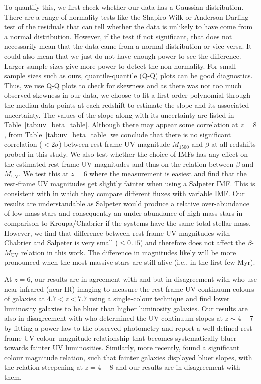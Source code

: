 \documentclass[twocolumn]{aastex63}
\begin{document}
To quantify this, we first check whether our data has a Gaussian distribution. There are a range of normality tests like the  Shapiro-Wilk or Anderson-Darling test of the residuals that can tell whether the data is unlikely to have come from a normal distribution. However, if the test if not significant, that does not necessarily mean that the data came from a normal distribution or vice-versa. It could also mean that we just do not have enough power to see the difference. Larger sample sizes give more power to detect the non-normality. For small sample sizes such as ours, quantile-quantile (Q-Q) plots can be good diagnostics. Thus, we use Q-Q plots to check for skewness and as there was not too much observed skewness in our data, we choose to fit a first-order polynomial through the median data points at each redshift to estimate the slope and its associated uncertainty. The values of the slope along with its uncertainty are listed in Table~\ref{tab:uv_beta_table}. Although there may appear some correlation at $z=8$, from Table~\ref{tab:uv_beta_table} we conclude that there is no significant correlation ($<2\sigma$) between rest-frame UV magnitude $M_{1500}$ and $\beta$ at all redshifts probed in this study. We also test whether the choice of IMFs has any effect on the estimated rest-frame UV magnitudes and thus on the relation between $\beta$ and $M_{\mathrm{UV}}$. We test this at $z=6$ where the measurement is easiest and find that the rest-frame UV magnitudes get slightly fainter when using a Salpeter IMF. This is consistent with \citet{Jerabkova2017} in which they compare different fluxes with variable IMF. Our results are understandable as Salpeter would produce a relative over-abundance of low-mass stars and consequently an under-abundance of high-mass stars in comparison to Kroupa/Chabrier if the systems have the same total stellar mass. However, we find that difference between rest-frame UV magnitudes with Chabrier and Salpeter is very small ($\leq0.15$) and therefore does not affect the $\beta$-$M_{\mathrm{UV}}$ relation in this work. The difference in magnitudes likely will be more pronounced when the most massive stars are still alive (i.e., in the first few Myr).

At $z=6$, our results are in agreement with \citet{Dunlop2012} and \citet{Finkelstein2012} but in disagreement with \citet{Wilkins2011} who use near-infrared (near-IR) imaging to measure the rest-frame UV continuum colours of galaxies at $4.7<z<7.7$ using a single-colour technique and find lower luminosity galaxies to be bluer than higher luminosity galaxies. Our results are also in disagreement with \citet{Bouwens2012} who determined the UV continuum slopes at $z\sim4-7$ by fitting a power law to the observed photometry and report a well-defined rest-frame UV colour--magnitude relationship that becomes systematically bluer towards fainter UV luminosities. Similarly, more recently, \citet{Bouwens2014b} found a significant colour magnitude relation, such that fainter galaxies displayed bluer slopes, with the relation steepening at $z=4-8$ and our results are in disagreement with them. 
\end{document}

